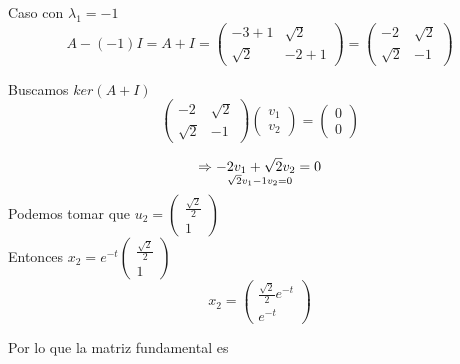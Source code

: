 Caso con $\lambda_{1}=-1$ 
\begin{equation*}
    A - (-1) I = A + I =
\begin{pmatrix}
-3 +1 & \sqrt{2} \\
\sqrt{2} & -2+1
\end{pmatrix}
=
\begin{pmatrix}
-2 & \sqrt{2} \\
\sqrt{2} & -1
\end{pmatrix}
\end{equation*}

Buscamos $ker(A + I)$
\begin{equation*}
    \begin{pmatrix}
-2 & \sqrt{2} \\
\sqrt{2} & -1
\end{pmatrix}
\begin{pmatrix}
v_{1}   \\
v_{2}  
\end{pmatrix} =
\begin{pmatrix}
0   \\
0  
\end{pmatrix}
\end{equation*}

\begin{equation*}
    \Rightarrow -2v_{1}+ \sqrt{2}v_{2}=0 \atop
    \sqrt{2}v_{1}-1v_{2} =0
\end{equation*}
Podemos tomar que $u_{2}=\begin{pmatrix}
\frac{\sqrt{2}}{2} \\
1
\end{pmatrix}$ \\
Entonces $x_{2}=e^{-t}\begin{pmatrix}
\frac{\sqrt{2}}{2} \\
1
\end{pmatrix}$ 
\begin{equation*}
    x_{2}=\begin{pmatrix}
\frac{\sqrt{2}}{2}e^{-t} \\
e^{-t}
\end{pmatrix}
\end{equation*}

Por lo que la matriz fundamental es 

